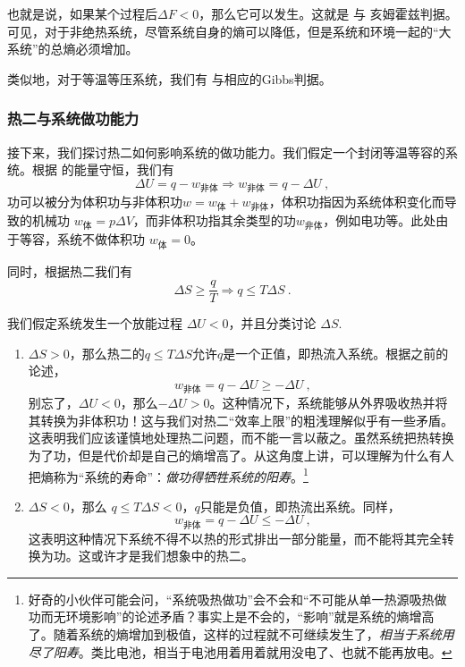 也就是说，如果某个过程后$\Delta F < 0$，那么它可以发生。这就是 与 亥姆霍兹判据。可见，对于非绝热系统，尽管系统自身的熵可以降低，但是系统和环境一起的“大系统”的总熵必须增加。

类似地，对于等温等压系统，我们有 与相应的Gibbs判据。

\subsubsection{热二与系统做功能力}
接下来，我们探讨热二如何影响系统的做功能力。我们假定一个封闭等温等容的系统。根据 的能量守恒，我们有
$$\Delta U = q - w_{\text{非体}} \Rightarrow w_{\text{非体}} = q - \Delta U ~,$$ 
功可以被分为体积功与非体积功$w = w_\text{体}+w_\text{非体}$，体积功指因为系统体积变化而导致的机械功  $w_\text{体}=p\Delta V$，而非体积功指其余类型的功$w_\text{非体}$，例如电功等。此处由于等容，系统不做体积功 $w_\text{体} = 0$。

同时，根据热二我们有
$$
\Delta S \ge \frac{q}{T} \Rightarrow q \le T \Delta S~.
$$

我们假定系统发生一个放能过程 $\Delta U < 0$，并且分类讨论 $\Delta S$.
\begin{enumerate}
\item $\Delta S > 0$，那么热二的$q \le T\Delta S$允许$q$是一个正值，即热流入系统。根据之前的论述，
$$
w_\text{非体} = q - \Delta U \ge - \Delta U 
~,
$$
别忘了，$\Delta U<0$，那么$-\Delta U>0$。这种情况下，系统能够从外界吸收热并将其转换为非体积功！这与我们对热二“效率上限”的粗浅理解似乎有一些矛盾。这表明我们应该谨慎地处理热二问题，而不能一言以蔽之。虽然系统把热转换为了功，但是代价却是自己的熵增高了。从这角度上讲，可以理解为什么有人把熵称为“系统的寿命”：\textsl{做功得牺牲系统的阳寿}。\footnote{好奇的小伙伴可能会问，“系统吸热做功”会不会和“不可能从单一热源吸热做功而无环境影响”的论述矛盾？事实上是不会的，“影响”就是系统的熵增高了。随着系统的熵增加到极值，这样的过程就不可继续发生了，\textsl{相当于系统用尽了阳寿}。类比电池，相当于电池用着用着就用没电了、也就不能再放电。}
\item $\Delta S < 0$，那么 $q \le T\Delta S < 0$，$q$只能是负值，即热流出系统。同样，
$$
w_\text{非体} = q - \Delta U \le - \Delta U 
~,
$$
这表明这种情况下系统不得不以热的形式排出一部分能量，而不能将其完全转换为功。这或许才是我们想象中的热二。
\end{enumerate}

